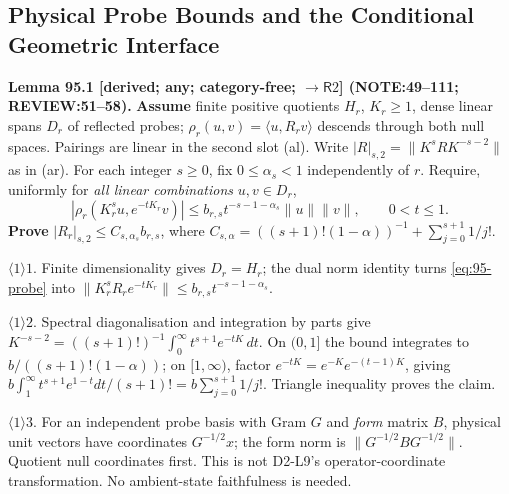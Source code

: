 \subsection{Physical Probe Bounds and the Conditional Geometric Interface}
\textbf{Lemma 95.1 [derived; any; category-free; \(\to\mathsf R2\)] (NOTE:49--111; REVIEW:51--58).}
\textbf{Assume} finite positive quotients \(H_r\), \(K_r\ge1\), dense linear spans \(D_r\) of reflected probes;
\(\rho_r(u,v)=\langle u,R_rv\rangle\) descends through both null spaces. Pairings are linear in the second slot (al).
Write \(|R|_{s,2}=\|K^sRK^{-s-2}\|\) as in (ar). For each integer \(s\ge0\), fix \(0\le\alpha_s<1\) independently of \(r\).
Require, uniformly for \emph{all linear combinations} \(u,v\in D_r\),
\begin{equation}\label{eq:95-probe}
 |\rho_r(K_r^su,e^{-tK_r}v)|\le b_{r,s}t^{-s-1-\alpha_s}\|u\|\|v\|,\qquad 0<t\le1.
\end{equation}
\textbf{Prove} \(|R_r|_{s,2}\le C_{s,\alpha_s}b_{r,s}\), where
\(C_{s,\alpha}=((s+1)!(1-\alpha))^{-1}+\sum_{j=0}^{s+1}1/j!\).
\par\(\langle1\rangle1\). Finite dimensionality gives \(D_r=H_r\); the dual norm identity turns
\eqref{eq:95-probe} into \(\|K_r^sR_re^{-tK_r}\|\le b_{r,s}t^{-s-1-\alpha_s}\).
\par\(\langle1\rangle2\). Spectral diagonalisation and integration by parts give
\(K^{-s-2}=((s+1)!)^{-1}\int_0^\infty t^{s+1}e^{-tK}\,dt\). On \((0,1]\) the bound integrates to
\(b/((s+1)!(1-\alpha))\); on \([1,\infty)\), factor \(e^{-tK}=e^{-K}e^{-(t-1)K}\), giving
\(b\int_1^\infty t^{s+1}e^{1-t}dt/(s+1)!=b\sum_{j=0}^{s+1}1/j!\). Triangle inequality proves the claim.
\par\(\langle1\rangle3\). For an independent probe basis with Gram \(G\) and \emph{form} matrix \(B\), physical
unit vectors have coordinates \(G^{-1/2}x\); the form norm is \(\|G^{-1/2}BG^{-1/2}\|\).
Quotient null coordinates first. This is not D2-L9's operator-coordinate transformation. No ambient-state faithfulness is needed.

